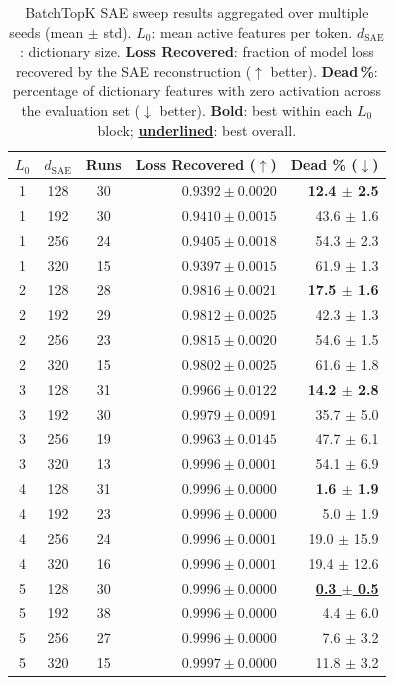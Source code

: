 \begin{table}[htbp]
\centering
\caption{BatchTopK SAE sweep results aggregated over multiple seeds (mean $\pm$ std). $L_0$: mean active features per token. $d_\text{SAE}$: dictionary size. \textbf{Loss Recovered}: fraction of model loss recovered by the SAE reconstruction ($\uparrow$ better). \textbf{Dead\,\%}: percentage of dictionary features with zero activation across the evaluation set ($\downarrow$ better).
\textbf{Bold}: best within each $L_0$ block; \underline{\textbf{underlined}}: best overall.}
\label{tab:btk_sae_sweep}
\begin{tabular}{cccrr}
\toprule
$L_0$ & $d_\text{SAE}$ & Runs & Loss Recovered ($\uparrow$) & Dead \% ($\downarrow$) \\
\midrule
  1 & 128 & 30 & $0.9392 \pm 0.0020$ & \textbf{12.4 $\pm$ 2.5} \\
  1 & 192 & 30 & $\mathbf{0.9410 \pm 0.0015}$ & 43.6 $\pm$ 1.6 \\
  1 & 256 & 24 & $0.9405 \pm 0.0018$ & 54.3 $\pm$ 2.3 \\
  1 & 320 & 15 & $0.9397 \pm 0.0015$ & 61.9 $\pm$ 1.3 \\
\midrule
  2 & 128 & 28 & $\mathbf{0.9816 \pm 0.0021}$ & \textbf{17.5 $\pm$ 1.6} \\
  2 & 192 & 29 & $0.9812 \pm 0.0025$ & 42.3 $\pm$ 1.3 \\
  2 & 256 & 23 & $0.9815 \pm 0.0020$ & 54.6 $\pm$ 1.5 \\
  2 & 320 & 15 & $0.9802 \pm 0.0025$ & 61.6 $\pm$ 1.8 \\
\midrule
  3 & 128 & 31 & $0.9966 \pm 0.0122$ & \textbf{14.2 $\pm$ 2.8} \\
  3 & 192 & 30 & $0.9979 \pm 0.0091$ & 35.7 $\pm$ 5.0 \\
  3 & 256 & 19 & $0.9963 \pm 0.0145$ & 47.7 $\pm$ 6.1 \\
  3 & 320 & 13 & $\mathbf{0.9996 \pm 0.0001}$ & 54.1 $\pm$ 6.9 \\
\midrule
  4 & 128 & 31 & $\mathbf{0.9996 \pm 0.0000}$ & \textbf{1.6 $\pm$ 1.9} \\
  4 & 192 & 23 & $\mathbf{0.9996 \pm 0.0000}$ & 5.0 $\pm$ 1.9 \\
  4 & 256 & 24 & $\mathbf{0.9996 \pm 0.0001}$ & 19.0 $\pm$ 15.9 \\
  4 & 320 & 16 & $\mathbf{0.9996 \pm 0.0001}$ & 19.4 $\pm$ 12.6 \\
\midrule
  5 & 128 & 30 & $0.9996 \pm 0.0000$ & \underline{\textbf{0.3 $\pm$ 0.5}} \\
  5 & 192 & 38 & $0.9996 \pm 0.0000$ & 4.4 $\pm$ 6.0 \\
  5 & 256 & 27 & $0.9996 \pm 0.0000$ & 7.6 $\pm$ 3.2 \\
  5 & 320 & 15 & \underline{$\mathbf{0.9997 \pm 0.0000}$} & 11.8 $\pm$ 3.2 \\
\bottomrule
\end{tabular}
\end{table}

